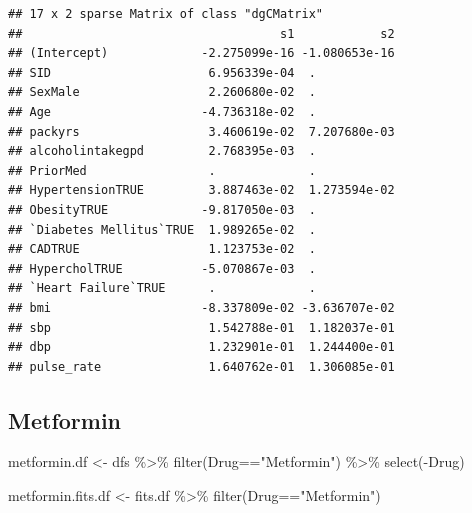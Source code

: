 \documentclass[
]{article}
\newenvironment{Shaded}{\begin{snugshade}}{\end{snugshade}}
\newcommand{\FloatTok}[1]{\textcolor[rgb]{0.00,0.00,0.81}{#1}}
\newcommand{\FunctionTok}[1]{\textcolor[rgb]{0.00,0.00,0.00}{#1}}
\newcommand{\NormalTok}[1]{#1}
\newcommand{\OtherTok}[1]{\textcolor[rgb]{0.56,0.35,0.01}{#1}}
\newcommand{\SpecialCharTok}[1]{\textcolor[rgb]{0.00,0.00,0.00}{#1}}
\newcommand{\StringTok}[1]{\textcolor[rgb]{0.31,0.60,0.02}{#1}}
\begin{document}
\begin{Shaded}
\end{Shaded}

\begin{verbatim}
## 17 x 2 sparse Matrix of class "dgCMatrix"
##                                    s1            s2
## (Intercept)             -2.275099e-16 -1.080653e-16
## SID                      6.956339e-04  .           
## SexMale                  2.260680e-02  .           
## Age                     -4.736318e-02  .           
## packyrs                  3.460619e-02  7.207680e-03
## alcoholintakegpd         2.768395e-03  .           
## PriorMed                 .             .           
## HypertensionTRUE         3.887463e-02  1.273594e-02
## ObesityTRUE             -9.817050e-03  .           
## `Diabetes Mellitus`TRUE  1.989265e-02  .           
## CADTRUE                  1.123753e-02  .           
## HypercholTRUE           -5.070867e-03  .           
## `Heart Failure`TRUE      .             .           
## bmi                     -8.337809e-02 -3.636707e-02
## sbp                      1.542788e-01  1.182037e-01
## dbp                      1.232901e-01  1.244400e-01
## pulse_rate               1.640762e-01  1.306085e-01
\end{verbatim}

\hypertarget{metformin}{%
\subsection{Metformin}\label{metformin}}

\begin{Shaded}
\begin{Highlighting}[]
\NormalTok{metformin.df }\OtherTok{\textless{}{-}}\NormalTok{ dfs }\SpecialCharTok{\%\textgreater{}\%} 
  \FunctionTok{filter}\NormalTok{(Drug}\SpecialCharTok{==}\StringTok{"Metformin"}\NormalTok{) }\SpecialCharTok{\%\textgreater{}\%} 
  \FunctionTok{select}\NormalTok{(}\SpecialCharTok{{-}}\NormalTok{Drug)}
\end{Highlighting}
\end{Shaded}

\begin{Shaded}
\begin{Highlighting}[]
\NormalTok{metformin.fits.df }\OtherTok{\textless{}{-}}\NormalTok{ fits.df }\SpecialCharTok{\%\textgreater{}\%} 
  \FunctionTok{filter}\NormalTok{(Drug}\SpecialCharTok{==}\StringTok{"Metformin"}\NormalTok{)}
\end{Highlighting}
\end{Shaded}
\end{document}
